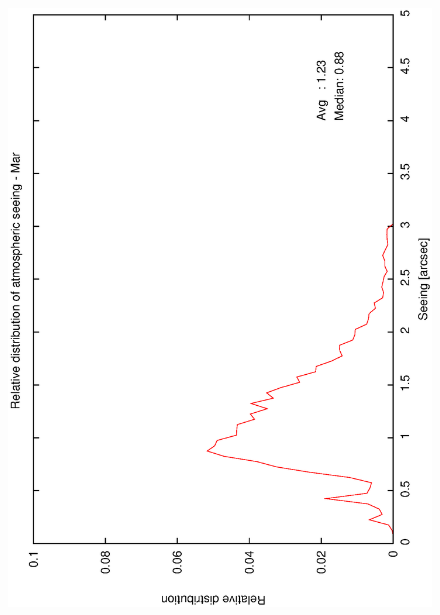 {{\begin{figure}[htbp]
\begin{center}
{   \includegraphics[scale=0.25, angle=-90]{figures/ecs/corr_see_dist_mar.eps}
   \label{fig:see_dist_mar}
  }
 \subfigure[] {
}
\end{center}
\end{figure}}}
